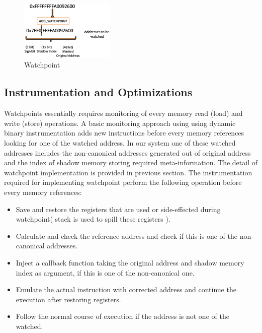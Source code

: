 \begin{figure}[h!]
\centering
 	\includegraphics[width=0.4\textwidth]{Picture6-png}
\caption{Watchpoint}\label{fig:watchpoint}
\end{figure}


\subsection {Instrumentation and Optimizations}
Watchpoints essentially requires monitoring of every memory read (load) and write (store) operations. A basic monitoring approach using using dynamic binary instrumentation adds new instructions before every memory references looking for one of the watched address. In our system one of these watched addresses includes the non-canonical addresses generated out of original address and the index of shadow memory storing required meta-information. The detail of watchpoint implementation is provided in previous section. The instrumentation required for implementing watchpoint perform the following operation before every memory references: 

\begin{itemize}
	\item Save and restore the registers that are used or side-effected during watchpoint( stack is used to spill these registers ).
	\item Calculate and check the reference address and check if this is one of the non-canonical addresses.
	\item Inject a callback function taking the original address and shadow memory index as argument, if this is one of the non-canonical one. 
	\item Emulate the actual instruction with corrected address and continue the execution after restoring registers.
	\item Follow the normal course of execution if the address is not one of the watched.
\end{itemize}

